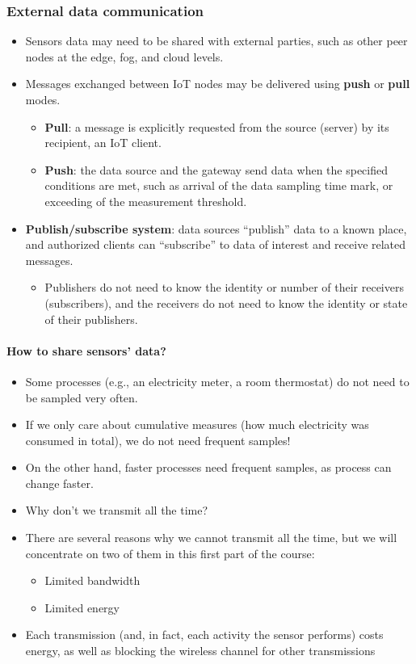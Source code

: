 \subsubsection{External data communication}
\begin{itemize}
    \item Sensors data may need to be shared with external parties, such as other peer nodes at the edge, fog, and cloud levels.
    \item Messages exchanged between IoT nodes may be delivered using \textbf{push} or \textbf{pull} modes.
    \begin{itemize}
        \item \textbf{Pull}: a message is explicitly requested from the source (server) by its recipient, an IoT client.
        \item \textbf{Push}: the data source and the gateway send data when the specified conditions are met, such as arrival of the data sampling time mark, or exceeding of the measurement threshold.
    \end{itemize}
    \item \textbf{Publish/subscribe system}: data sources ``publish'' data to a known place, and authorized clients can ``subscribe'' to data of interest and receive related messages.
    \begin{itemize}
        \item Publishers do not need to know the identity or number of their receivers (subscribers), and the receivers do not need to know the identity or state of their publishers.
    \end{itemize}
\end{itemize}

\paragraph{How to share sensors' data?}
\begin{itemize}
    \item Some processes (e.g., an electricity meter, a room thermostat) do not need to be sampled very often.
    \item If we only care about cumulative measures (how much electricity was consumed in total), we do not need frequent samples!
    \item On the other hand, faster processes need frequent samples, as process can change faster.
    \item Why don't we transmit all the time?
    \item There are several reasons why we cannot transmit all the time, but we will concentrate on two of them in this first part of the course:
    \begin{itemize}
        \item Limited bandwidth
        \item Limited energy
    \end{itemize}
    \item Each transmission (and, in fact, each activity the sensor performs) costs energy, as well as blocking the wireless channel for other transmissions
\end{itemize}

